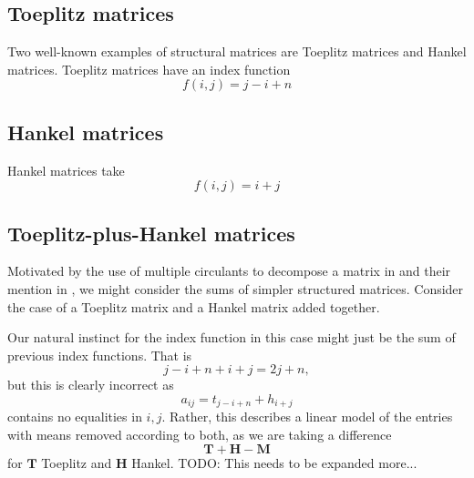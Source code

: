\documentclass[letterpaper,12pt,oneside,final]{article}
\newcommand{\m}[1]{\mathbf{#1}}               %
\newcommand{\TODO}[1]{{\color{brickred} TODO:  {#1}}}
\begin{document}
\subsection{Toeplitz matrices}

Two well-known examples of structural matrices are Toeplitz matrices and Hankel matrices. Toeplitz matrices have an index function
$$f(i,j) = j - i + n$$

\subsection{Hankel matrices}

Hankel matrices take
$$f(i,j) = i + j$$

\subsection{Toeplitz-plus-Hankel matrices}

Motivated by the use of multiple circulants to decompose a matrix in \cite{venkatapathi2021circulant} and their mention in \cite{yelim2016algorithms}, we might consider the sums of simpler structured matrices. Consider the case of a Toeplitz matrix and a Hankel matrix added together.

Our natural instinct for the index function in this case might just be the sum of previous index functions. That is
$$j - i + n + i + j = 2j + n,$$
but this is clearly incorrect as
$$a_{ij} = t_{j - i + n} + h_{i + j}$$
contains no equalities in $i,j$.
Rather, this describes a linear model of the entries with means removed according to both, as we are taking a difference
$$\m{T} + \m{H} - \m{M}$$
for $\m{T}$ Toeplitz and $\m{H}$ Hankel. \TODO{This needs to be expanded more...}



\end{document}
